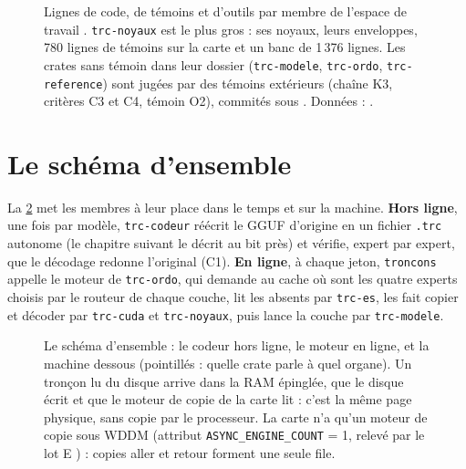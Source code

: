 \begin{figure}[ht]
\centering
\TdArchGrapheLignes
\caption[Lignes de code, de témoins et d'outils par membre]{Lignes de code, de témoins et d'outils par membre de l'espace de travail \calc. \texttt{trc-noyaux} est le plus gros : ses noyaux, leurs enveloppes, 780 lignes de témoins sur la carte et un banc de 1\,376 lignes. Les crates sans témoin dans leur dossier (\texttt{trc-modele}, \texttt{trc-ordo}, \texttt{trc-reference}) sont jugées par des témoins extérieurs (chaîne K3, critères C3 et C4, témoin O2), commités sous . Données : .}
\label{t2arch:fig:lignes}
\end{figure}

\section{Le schéma d'ensemble}\label{t2arch:sec:ensemble}

La \cref{t2arch:fig:ensemble} met les membres à leur place dans le temps et sur la machine. \textbf{Hors ligne}, une fois par modèle, \texttt{trc-codeur} réécrit le GGUF d'origine en un fichier \texttt{.trc} autonome (le chapitre suivant le décrit au bit près) et vérifie, expert par expert, que le décodage redonne l'original (C1). \textbf{En ligne}, à chaque jeton, \texttt{troncons} appelle le moteur de \texttt{trc-ordo}, qui demande au cache où sont les quatre experts choisis par le routeur de chaque couche, lit les absents par \texttt{trc-es}, les fait copier et décoder par \texttt{trc-cuda} et \texttt{trc-noyaux}, puis lance la couche par \texttt{trc-modele}.

\begin{figure}[ht]
\centering
\TdArchEnsemble
\caption[Le schéma d'ensemble]{Le schéma d'ensemble : le codeur hors ligne, le moteur en ligne, et la machine dessous (pointillés : quelle crate parle à quel organe). Un tronçon lu du disque arrive dans la RAM épinglée, que le disque écrit et que le moteur de copie de la carte lit : c'est la même page physique, sans copie par le processeur. La carte n'a qu'un moteur de copie sous WDDM (attribut \texttt{ASYNC\_ENGINE\_COUNT} = 1, relevé par le lot E \mes) : copies aller et retour forment une seule file.}
\label{t2arch:fig:ensemble}
\end{figure}

